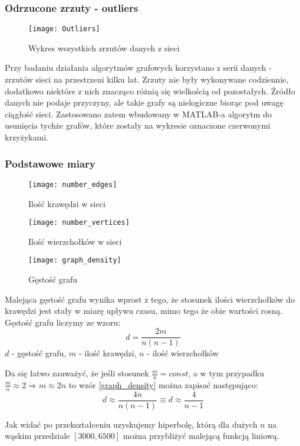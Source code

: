 \FloatBarrier
\subsubsection{Odrzucone zrzuty - outliers}
\begin{figure}[h]
	\centering
	\texttt{[image: Outliers]}
	\caption{Wykres wszystkich zrzutów danych z sieci}
\end{figure}
Przy badaniu działania algorytmów grafowych korzystano z serii danych - zrzutów sieci na przestrzeni kilku lat. Zrzuty nie były wykonywane codziennie, dodatkowo niektóre z nich znacząco różnią się wielkością od pozostałych. Źródło danych nie podaje przyczyny, ale takie grafy są nielogiczne biorąc pod uwagę ciągłość sieci. Zastosowano zatem wbudowany w MATLAB-a algorytm do usunięcia tychże grafów, które zostały na wykresie oznaczone czerwonymi krzyżykami.
\FloatBarrier
\subsubsection{Podstawowe miary}
\begin{figure}[h]
	\centering
	\texttt{[image: number\_edges]}
	\caption{Ilość krawędzi w sieci}
\end{figure}
\FloatBarrier
\FloatBarrier
\begin{figure}[h]
	\centering
	\texttt{[image: number\_vertices]}
	\caption{Ilość wierzchołków w sieci}
\end{figure}
\FloatBarrier
\FloatBarrier
\begin{figure}[h]
	\centering
	\texttt{[image: graph\_density]}
	\caption{Gęstość grafu}
\end{figure}
\FloatBarrier
Malejąca gęstość grafu wynika wprost z tego, że stosunek ilości wierzchołków do krawędzi jest stały w miarę upływu czasu, mimo tego że obie wartości rosną. Gęstość grafu liczymy ze wzoru:
\begin{equation}
\label{graph_density}
d=\frac{2m}{n(n-1)}
\end{equation}
$d$ - gęstość grafu, 
$m$ - ilość krawędzi, 
$n$ - ilość wierzchołków

Da się łatwo zauważyć, że jeśli stosunek $\frac{m}{n} = const$, a w tym przypadku $\frac{m}{n} \approx 2 \Rightarrow m \approx 2n$ to wzór \ref{graph_density} można zapisać następująco:
\begin{equation}
\label{graph_density_simplified}
d \approx \frac{4n}{n(n-1)} \equiv d \approx \frac{4}{n-1}
\end{equation}

Jak widać po przekształceniu uzyskujemy hiperbolę, którą dla dużych $n$ na wąskim przedziale $[3000, 6500]$ można przybliżyć malejącą funkcją liniową.
\FloatBarrier
\newpage